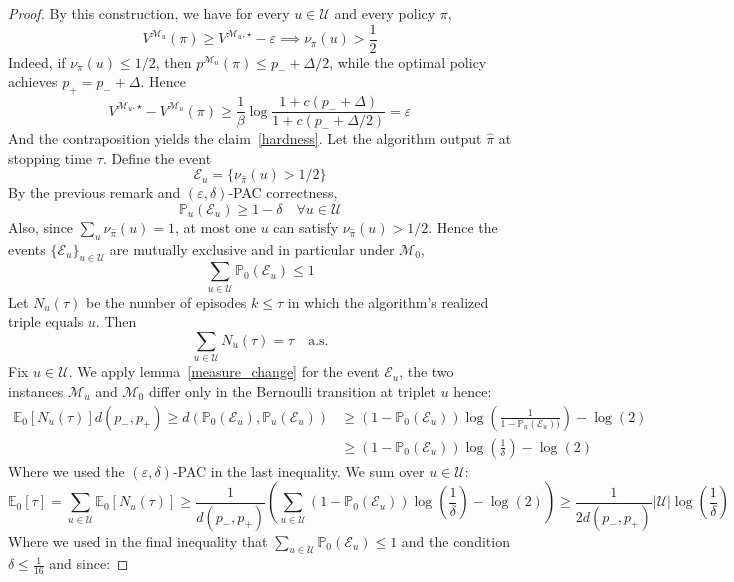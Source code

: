 \documentclass[final,12pt]{colt2026} %
\begin{document}
\begin{proof}
By this construction, we have for every $u \in \mathcal{U}$ and every policy $\pi$,
\begin{equation}\label{hardness}
V^{\mathcal{M}_u}(\pi) \geq V^{\mathcal{M}_u, \star} - \varepsilon \implies \nu_{\pi}(u) > \frac{1}{2}\end{equation}
Indeed, if $\nu_{\pi}(u) \leq 1/2$, then $p^{\mathcal{M}_u}(\pi) \leq p_- + \Delta/2$, while the optimal policy achieves $p_+ = p_- + \Delta$. Hence
$$V^{\mathcal{M}_u,\star} - V^{\mathcal{M}_u}(\pi) \geq \frac{1}{\beta} \log \frac{1 + c(p_- + \Delta)}{1 + c(p_- + \Delta/2)} = \varepsilon$$
And the contraposition yields the claim~\eqref{hardness}.
Let the algorithm output $\hat{\pi}$ at stopping time $\tau$. Define the event
$$\mathcal{E}_u = \{\nu_{\hat{\pi}}(u) > 1/2\}$$
By the previous remark and $(\varepsilon, \delta)$-PAC correctness,
$$\mathbb{P}_{u}(\mathcal{E}_u) \geq 1 - \delta \quad \forall u \in \mathcal{U}$$
Also, since $\sum_u \nu_{\hat{\pi}}(u) = 1$, at most one $u$ can satisfy $\nu_{\hat{\pi}}(u) > 1/2$. Hence the events $\{\mathcal{E}_u\}_{u \in \mathcal{U}}$ are mutually exclusive and in particular under $\mathcal{M}_0$,
$$\sum_{u \in \mathcal{U}} \mathbb{P}_{0}(\mathcal{E}_u) \leq 1$$
Let $N_u(\tau)$ be the number of episodes $k \leq \tau$ in which the algorithm's realized triple equals $u$. Then
$$\sum_{u \in \mathcal{U}} N_u(\tau) = \tau \quad \text{a.s.}$$
Fix $u \in \mathcal{U}$. We apply lemma~\ref{measure_change} for the event $\mathcal{E}_u$, the two instances $\mathcal{M}_u$ and $\mathcal{M}_0$ differ only in the Bernoulli transition at triplet $u$ hence:
\begin{align*}
\mathbb{E}_0[N_u(\tau)] d(p_-,p_+) \geq d(\mathbb{P}_0(\mathcal{E}_u),\mathbb{P}_u(\mathcal{E}_u)) &\geq (1 - \mathbb{P}_0(\mathcal{E}_u) )\log\left(\frac{1}{1 - \mathbb{P}_u(\mathcal{E}_u))}\right) - \log(2) \\&\geq (1 - \mathbb{P}_0(\mathcal{E}_u) )\log\left(\frac{1}{\delta}\right) - \log(2)
\end{align*}
Where we used the $(\varepsilon,\delta)$-PAC in the last inequality. We sum over $u \in \mathcal{U}$:
$$\mathbb{E}_0[\tau] = \sum_{u \in \mathcal{U}} \mathbb{E}_0[N_u(\tau)] \geq \frac{1}{d(p_-,p_+)}\left(\sum_{u \in \mathcal{U}}  (1 - \mathbb{P}_0(\mathcal{E}_u) )\log\left(\frac{1}{\delta}\right) - \log(2) \right)\geq \frac{1}{2d(p_-,p_+)}|\mathcal{U|} \log\left(\frac{1}{\delta}\right)$$
Where we used in the final inequality that $\sum_{u \in \mathcal{U}} \mathbb{P}_{0}(\mathcal{E}_u) \leq 1$ and the condition $\delta \leq \frac{1}{16}$ and since:

\end{proof}
\end{document}
